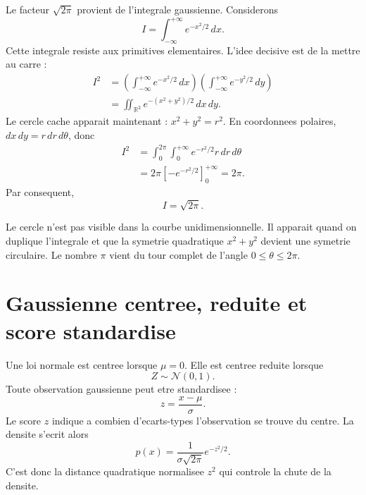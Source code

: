 Le facteur $\sqrt{2\pi}$ provient de l'integrale gaussienne. Considerons
\begin{equation}
I=\int_{-\infty}^{+\infty}e^{-x^2/2}\,dx.
\end{equation}
Cette integrale resiste aux primitives elementaires. L'idee decisive est de la
mettre au carre :
\begin{align}
I^2
&=\left(\int_{-\infty}^{+\infty}e^{-x^2/2}\,dx\right)
  \left(\int_{-\infty}^{+\infty}e^{-y^2/2}\,dy\right)\\
&=\iint_{\mathbb R^2}e^{-(x^2+y^2)/2}\,dx\,dy.
\end{align}
Le cercle cache apparait maintenant : $x^2+y^2=r^2$. En coordonnees polaires,
$dx\,dy=r\,dr\,d\theta$, donc
\begin{align}
I^2
&=\int_0^{2\pi}\int_0^{+\infty}e^{-r^2/2}r\,dr\,d\theta\\
&=2\pi\left[-e^{-r^2/2}\right]_{0}^{+\infty}=2\pi.
\end{align}
Par consequent,
\begin{equation}
I=\sqrt{2\pi}.
\end{equation}

\begin{intuitionbox}
Le cercle n'est pas visible dans la courbe unidimensionnelle. Il apparait quand
on duplique l'integrale et que la symetrie quadratique $x^2+y^2$ devient une
symetrie circulaire. Le nombre $\pi$ vient du tour complet de l'angle
$0\le\theta\le2\pi$.
\end{intuitionbox}

\section{Gaussienne centree, reduite et score standardise}

Une loi normale est centree lorsque $\mu=0$. Elle est centree reduite lorsque
\begin{equation}
Z\sim\mathcal N(0,1).
\end{equation}
Toute observation gaussienne peut etre standardisee :
\begin{equation}
z=\frac{x-\mu}{\sigma}.
\end{equation}
Le score $z$ indique a combien d'ecarts-types l'observation se trouve du centre.
La densite s'ecrit alors
\begin{equation}
p(x)=\frac{1}{\sigma\sqrt{2\pi}}e^{-z^2/2}.
\end{equation}
C'est donc la distance quadratique normalisee $z^2$ qui controle la chute de la
densite.

